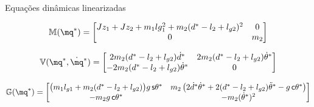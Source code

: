 \documentclass[25pt,landscape]{beamer}
\begin{document}
\begin{frame}{Equa\c{c}\~oes din\^amicas linearizadas}
    \begin{block}{}
    	\begin{equation}
			\mM(\mq^*) = 
			\begin{bmatrix}
				Jz_1 + Jz_2 + m_1 lg_1^2 + m_2 (d^* - l_2 + l_{g2})^2 & 0 \\
				0 & m_2
			\end{bmatrix}
		\end{equation}

		\begin{equation}
			\mV(\mq^*, \dot{\mq}^*) =
			\begin{bmatrix}
				2 m_2 (d^* -l_2+l_{g2}) \dot{d}^* & 2 m_2 (d^* -l_2+l_{g2}) \dot{\theta}^* \\
				-2 m_2 (d^* -l_2+l_{g2}) \dot{\theta}^* & 0
			\end{bmatrix}
		\end{equation}

		\footnotesize
		\begin{equation}
			\mG(\mq^*) =
			\begin{bmatrix}
				\big( m_1 l_{g1}  + m_2 ( d^* -l_2 + l_{g2})\big) g \,\ssin \theta^* & m_2 \left(2 \dot{d}^* \dot{\theta}^*+2  (d^*-l_2+l_{g2})\ddot{\theta}^* -g \, \ccos \theta^*\right) \\
				-m_2 g \, \ccos\theta^* & -m_2 (\dot{\theta}^*)^2
			\end{bmatrix}
		\end{equation}
		\normalsize
    \end{block}
\end{frame}
\end{document}
